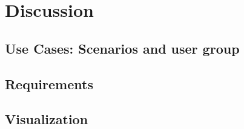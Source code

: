 \chapter{Discussion}

\section{Use Cases: Scenarios and user group}

\section{Requirements}

\section{Visualization}

